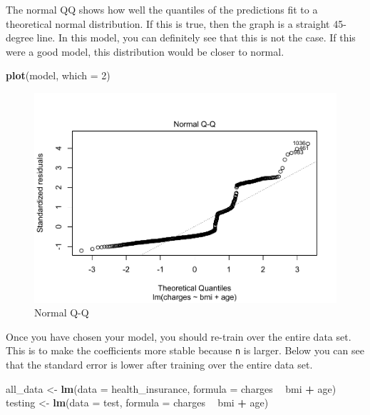 \documentclass[openany]{book}
\newenvironment{Shaded}{\begin{snugshade}}{\end{snugshade}}
\newcommand{\DataTypeTok}[1]{\textcolor[rgb]{0.13,0.29,0.53}{#1}}
\newcommand{\DecValTok}[1]{\textcolor[rgb]{0.00,0.00,0.81}{#1}}
\newcommand{\KeywordTok}[1]{\textcolor[rgb]{0.13,0.29,0.53}{\textbf{#1}}}
\newcommand{\NormalTok}[1]{#1}
\newcommand{\OperatorTok}[1]{\textcolor[rgb]{0.81,0.36,0.00}{\textbf{#1}}}
\newcommand{\StringTok}[1]{\textcolor[rgb]{0.31,0.60,0.02}{#1}}
\begin{document}
The normal QQ shows how well the quantiles of the predictions fit to a theoretical normal distribution. If this is true, then the graph is a straight 45-degree line. In this model, you can definitely see that this is not the case. If this were a good model, this distribution would be closer to normal.

\begin{Shaded}
\begin{Highlighting}[]
\KeywordTok{plot}\NormalTok{(model, }\DataTypeTok{which =} \DecValTok{2}\NormalTok{)}
\end{Highlighting}
\end{Shaded}

\begin{figure}
\centering
\includegraphics{05-linear-models_files/figure-latex/unnamed-chunk-10-1.pdf}
\caption{\label{fig:unnamed-chunk-10}Normal Q-Q}
\end{figure}

Once you have chosen your model, you should re-train over the entire data set. This is to make the coefficients more stable because \texttt{n} is larger. Below you can see that the standard error is lower after training over the entire data set.

\begin{Shaded}
\begin{Highlighting}[]
\NormalTok{all_data <-}\StringTok{ }\KeywordTok{lm}\NormalTok{(}\DataTypeTok{data =}\NormalTok{ health_insurance, }
               \DataTypeTok{formula =}\NormalTok{ charges }\OperatorTok{~}\StringTok{ }\NormalTok{bmi }\OperatorTok{+}\StringTok{ }\NormalTok{age)}
\NormalTok{testing <-}\StringTok{ }\KeywordTok{lm}\NormalTok{(}\DataTypeTok{data =}\NormalTok{ test, }
              \DataTypeTok{formula =}\NormalTok{ charges }\OperatorTok{~}\StringTok{ }\NormalTok{bmi }\OperatorTok{+}\StringTok{ }\NormalTok{age)}
\end{Highlighting}
\end{Shaded}
\end{document}
